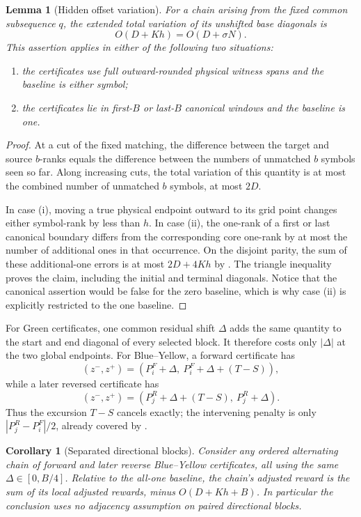 \documentclass[11pt]{article}
\newtheorem{lemma}[lemma]{Lemma}
\newtheorem{corollary}[corollary]{Corollary}
\theoremstyle{remark}
\begin{document}
\begin{lemma}[Hidden offset variation]\label{lem:TV}
For a chain arising from the fixed common subsequence $q$, the extended total
variation of its unshifted base diagonals is
\[
 O(D+Kh)=O(D+\sigma N).
\]
This assertion applies in either of the following two situations:
\begin{enumerate}[label=(\roman*)]
\item the certificates use full outward-rounded physical witness spans and
      the baseline is either symbol;
\item the certificates lie in first-$B$ or last-$B$ canonical windows and
      the baseline is one.
\end{enumerate}
\end{lemma}

\begin{proof}
At a cut of the fixed matching, the difference between the target and source
$b$-ranks equals the difference between the numbers of unmatched $b$ symbols
seen so far.  Along increasing cuts, the total variation of this quantity is
at most the combined number of unmatched $b$ symbols, at most $2D$.

In case (i), moving a true physical endpoint outward to its grid point changes
either symbol-rank by less than $h$.  In case (ii), the one-rank of a first or
last canonical boundary differs from the corresponding core one-rank by at
most the number of additional ones in that occurrence.  On the disjoint
parity, the sum of these additional-one errors is at most
$2D+4Kh$ by .  The triangle inequality proves the
claim, including the initial and terminal diagonals.  Notice that the
canonical assertion would be false for the zero baseline, which is why
case (ii) is explicitly restricted to the one baseline.
\end{proof}

For Green certificates, one common residual shift $\Delta$ adds the same
quantity to the start and end diagonal of every selected block.  It therefore
costs only $|\Delta|$ at the two global endpoints.  For Blue--Yellow, a
forward certificate has
\[
 (z^-,z^+)=(P_i^F+\Delta,\ P_i^F+\Delta+(T-S)),
\]
while a later reversed certificate has
\[
 (z^-,z^+)=(P_j^R+\Delta+(T-S),\ P_j^R+\Delta).
\]
Thus the excursion $T-S$ cancels exactly; the intervening penalty is only
$|P_j^R-P_i^F|/2$, already covered by .

\begin{corollary}[Separated directional blocks]\label{cor:BY-separated}
Consider any ordered alternating chain of forward and later reverse
Blue--Yellow certificates, all using the same $\Delta\in[0,B/4]$.  Relative
to the all-one baseline, the chain's adjusted reward is the sum of its local
adjusted rewards, minus $O(D+Kh+B)$.  In particular the conclusion uses no
adjacency assumption on paired directional blocks.
\end{corollary}
\end{document}
